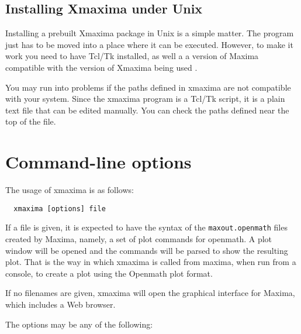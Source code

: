 \documentclass[12pt,makeidx,maxima]{book}
\begin{document}
\clearpage
\section{Installing Xmaxima under Unix}

Installing a prebuilt Xmaxima package in Unix is a simple matter. The
program just has to be moved into a place where it can be executed.
However, to make it work you need to have Tcl/Tk  installed,
as well a a version of Maxima compatible with the version of Xmaxima being
used .

You may run into problems if the paths defined in xmaxima are not compatible
with your system. Since the xmaxima program is a Tcl/Tk script, it is a
plain text file that can be edited manually. You can check the paths defined
near the top of the file.

\clearpage
\chapter{Command-line options}

The usage of xmaxima is as follows:

\begin{verbatim}
  xmaxima [options] file
\end{verbatim}

If a file is given, it is expected to have the syntax of the
\texttt{maxout.openmath} files created by Maxima, namely, a set of plot
commands for openmath. A plot window will be opened and the commands will be
parsed to show the resulting plot. That is the way in which xmaxima is
called from maxima, when run from a console, to create a plot using the
Openmath plot format.

If no filenames are given, xmaxima will open the graphical interface for
Maxima, which includes a Web browser.

The  options may be any of the following:
\end{document}
